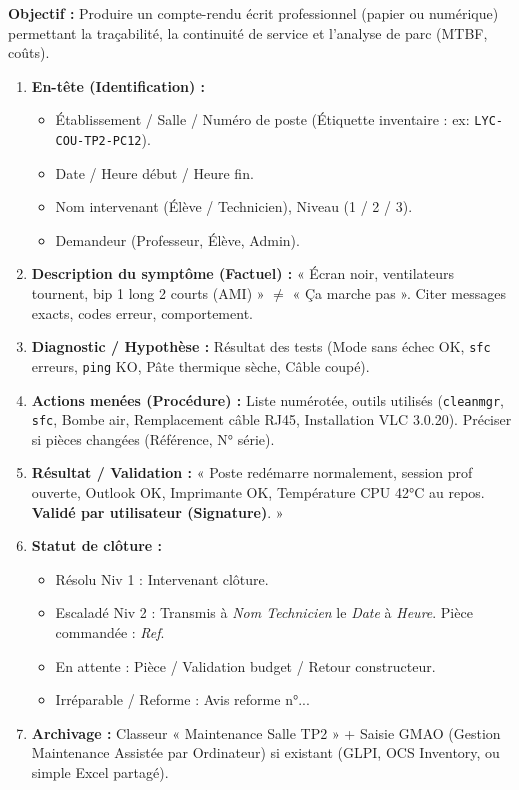 \documentclass[11pt]{article}
\newcommand{\cle}[1]{{\popxbold\color{popdark}#1}}
\begin{document}
\begin{methode}
    \textbf{Objectif :} Produire un compte-rendu écrit professionnel (papier ou numérique) permettant la traçabilité, la continuité de service et l'analyse de parc (MTBF, coûts).
    \begin{enumerate}
        \item \textbf{En-tête (Identification) :}
              \begin{itemize}
                  \item Établissement / Salle / Numéro de poste (Étiquette inventaire : ex: \texttt{LYC-COU-TP2-PC12}).
                  \item Date / Heure début / Heure fin.
                  \item Nom intervenant (Élève / Technicien), Niveau (1 / 2 / 3).
                  \item Demandeur (Professeur, Élève, Admin).
              \end{itemize}
        \item \textbf{Description du symptôme (Factuel) :} « Écran noir, ventilateurs tournent, bip 1 long 2 courts (AMI) » $\neq$ « Ça marche pas ». Citer messages exacts, codes erreur, comportement.
        \item \textbf{Diagnostic / Hypothèse :} Résultat des tests (Mode sans échec OK, \texttt{sfc} erreurs, \texttt{ping} KO, Pâte thermique sèche, Câble coupé).
        \item \textbf{Actions menées (Procédure) :} Liste numérotée, outils utilisés (\texttt{cleanmgr}, \texttt{sfc}, Bombe air, Remplacement câble RJ45, Installation VLC 3.0.20). Préciser si pièces changées (Référence, N° série).
        \item \textbf{Résultat / Validation :} « Poste redémarre normalement, session prof ouverte, Outlook OK, Imprimante OK, Température CPU 42°C au repos. \textbf{Validé par utilisateur (Signature)}. »
        \item \textbf{Statut de clôture :}
              \begin{itemize}
                  \item \cle{Résolu Niv 1} : Intervenant clôture.
                  \item \cle{Escaladé Niv 2} : Transmis à \textit{Nom Technicien} le \textit{Date} à \textit{Heure}. Pièce commandée : \textit{Ref}.
                  \item \cle{En attente} : Pièce / Validation budget / Retour constructeur.
                  \item \cle{Irréparable / Reforme} : Avis reforme n°...
              \end{itemize}
        \item \textbf{Archivage :} Classeur « Maintenance Salle TP2 » + Saisie GMAO (Gestion Maintenance Assistée par Ordinateur) si existant (GLPI, OCS Inventory, ou simple Excel partagé).
    \end{enumerate}
\end{methode}
\end{document}
